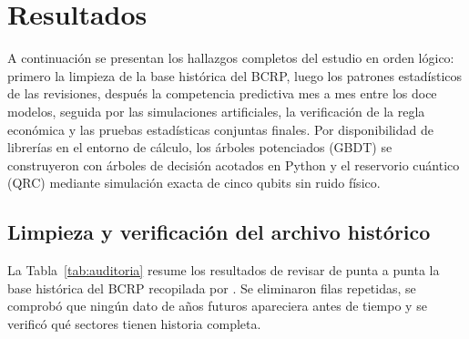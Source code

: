 \section{Resultados}

A continuación se presentan los hallazgos completos del estudio en orden lógico: primero la limpieza de la base histórica del BCRP, luego los patrones estadísticos de las revisiones, después la competencia predictiva mes a mes entre los doce modelos, seguida por las simulaciones artificiales, la verificación de la regla económica y las pruebas estadísticas conjuntas finales. Por disponibilidad de librerías en el entorno de cálculo, los árboles potenciados (GBDT) se construyeron con árboles de decisión acotados en Python y el reservorio cuántico (QRC) mediante simulación exacta de cinco qubits sin ruido físico.

\subsection{Limpieza y verificación del archivo histórico}
\label{subsec:auditoria_preliminar}

La Tabla~\ref{tab:auditoria} resume los resultados de revisar de punta a punta la base histórica del BCRP recopilada por \textcite{cruz2025}. Se eliminaron filas repetidas, se comprobó que ningún dato de años futuros apareciera antes de tiempo y se verificó qué sectores tienen historia completa.

